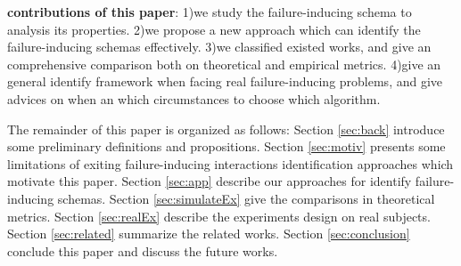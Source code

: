 \documentclass[10pt,journal,cspaper,compsoc]{IEEEtran}
\begin{document}
\textbf{contributions of this paper}:
1)we study the failure-inducing schema to analysis its properties.
2)we propose a new approach which can identify the failure-inducing schemas effectively.
3)we classified existed works, and give an comprehensive comparison both on theoretical and empirical metrics.
4)give an general identify framework when facing real failure-inducing problems, and give advices on when an which circumstances to choose which algorithm.

The remainder of this paper is organized as follows: Section \ref{sec:back} introduce some preliminary definitions and propositions. Section \ref{sec:motiv} presents some limitations of exiting failure-inducing interactions identification approaches which motivate this paper. Section \ref{sec:app} describe our approaches for identify failure-inducing schemas. Section \ref{sec:simulateEx} give the comparisons in theoretical metrics. Section \ref{sec:realEx} describe the experiments design on real subjects. Section \ref{sec:related} summarize the related works. Section \ref{sec:conclusion} conclude this paper and discuss the future works.
%
%

\end{document}
